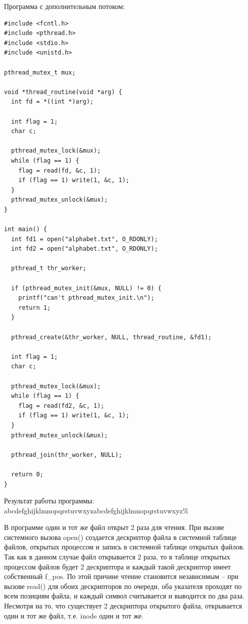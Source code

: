 Программа с дополнительным потоком:
\begin{lstlisting}
#include <fcntl.h>
#include <pthread.h>
#include <stdio.h>
#include <unistd.h>

pthread_mutex_t mux;

void *thread_routine(void *arg) {
  int fd = *((int *)arg);
  
  int flag = 1;
  char c;
  
  pthread_mutex_lock(&mux);
  while (flag == 1) {
    flag = read(fd, &c, 1);
    if (flag == 1) write(1, &c, 1);
  }
  pthread_mutex_unlock(&mux);
}

int main() {
  int fd1 = open("alphabet.txt", O_RDONLY);
  int fd2 = open("alphabet.txt", O_RDONLY);
  
  pthread_t thr_worker;
  
  if (pthread_mutex_init(&mux, NULL) != 0) {
    printf("can't pthread_mutex_init.\n");
    return 1;
  }
  
  pthread_create(&thr_worker, NULL, thread_routine, &fd1);
  
  int flag = 1;
  char c;
  
  pthread_mutex_lock(&mux);
  while (flag == 1) {
    flag = read(fd2, &c, 1);
    if (flag == 1) write(1, &c, 1);
  }
  pthread_mutex_unlock(&mux);
  
  pthread_join(thr_worker, NULL);
  
  return 0;
}
\end{lstlisting}
Результат работы программы:
abcdefghijklmnopqrstuvwxyzabcdefghijklmnopqrstuvwxyz\%

В программе один и тот же файл открыт 2 раза для чтения.  При вызове системного вызова open() создается дескриптор файла в системной таблице файлов, открытых процессом и запись в системной таблице открытых  файлов.  Так как в данном случае файл открывается 2 раза, то в таблице открытых процессом файлов будет 2 дескриптора и каждый такой дескриптор имеет собственный f\_pos. По этой причине чтение становится независимым --  при вызове read() для обоих дескрипторов по очереди, оба указателя проходят по всем позициям файла, и каждый символ считывается и выводится по два раза. 
Несмотря на то, что существует 2 дескриптора открытого файла, открывается один и тот же файл, т.е. inode один и тот же.

